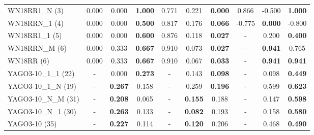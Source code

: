 \begin{table}[t]
{\begin{tabular}{l||ccc|ccc|ccc}
WN18RR1\_N (3) & 0.000 & 0.000 & \textbf{1.000} & 0.771 & 0.221 & \textbf{0.000} & 0.866 & -0.500 & \textbf{1.000} \\
WN18RRN\_1 (4) & 0.000 & 0.000 & \textbf{0.500} & 0.817 & 0.176 & \textbf{0.066} & -0.775 & \textbf{0.000} & -0.800 \\
WN18RR1\_1 (5) & 0.000 & 0.000 & \textbf{0.600} & 0.876 & 0.118 & \textbf{0.027} & - & 0.200 & \textbf{0.400} \\
WN18RRN\_M (6) & 0.000 & 0.333 & \textbf{0.667} & 0.910 & 0.073 & \textbf{0.027} & - & \textbf{0.941} & 0.765 \\
WN18RR (6) & 0.000 & 0.333 & \textbf{0.667} & 0.910 & 0.067 & \textbf{0.033} & - & \textbf{0.941} & \textbf{0.941} \\
YAGO3-10\_1\_1 (22) & - & 0.000 & \textbf{0.273} & - & 0.143 & \textbf{0.098} & - & 0.098 & \textbf{0.449} \\
YAGO3-10\_1\_N (19) & - & \textbf{0.267} & 0.158 & - & 0.259 & \textbf{0.196} & - & 0.599 & \textbf{0.623} \\
YAGO3-10\_N\_M (31) & - & \textbf{0.208} & 0.065 & - & \textbf{0.155} & 0.188 & - & 0.147 & \textbf{0.598} \\
YAGO3-10\_N\_1 (30) & - & \textbf{0.263} & 0.133 & - & \textbf{0.082} & 0.193 & - & 0.158 & \textbf{0.580} \\
YAGO3-10 (35) & - & \textbf{0.227} & 0.114 & - & \textbf{0.120} & 0.206 & - & 0.468 & \textbf{0.490} \\
\hline
\end{tabular}%
}
\end{table}
